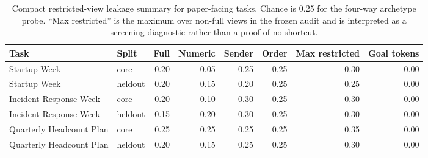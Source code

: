 \begin{table}[t]
  \centering
  \scriptsize
  \setlength{\tabcolsep}{4pt}
  \begin{tabular}{llrrrrrr}
    \toprule
    Task & Split & Full & Numeric & Sender & Order & Max restricted & Goal tokens \\
    \midrule
    Startup Week & core & 0.20 & 0.05 & 0.25 & 0.25 & 0.30 & 0.00 \\
    Startup Week & heldout & 0.20 & 0.15 & 0.20 & 0.25 & 0.25 & 0.00 \\
    Incident Response Week & core & 0.20 & 0.10 & 0.30 & 0.25 & 0.30 & 0.00 \\
    Incident Response Week & heldout & 0.15 & 0.20 & 0.30 & 0.25 & 0.30 & 0.00 \\
    Quarterly Headcount Plan & core & 0.25 & 0.25 & 0.25 & 0.25 & 0.35 & 0.00 \\
    Quarterly Headcount Plan & heldout & 0.20 & 0.15 & 0.25 & 0.25 & 0.30 & 0.00 \\
    \bottomrule
  \end{tabular}
  \caption{Compact restricted-view leakage summary for paper-facing tasks.
  Chance is 0.25 for the four-way archetype probe. ``Max restricted'' is the
  maximum over non-full views in the frozen audit and is interpreted as a
  screening diagnostic rather than a proof of no shortcut.}
  \label{tab:leakagecompact}
\end{table}

